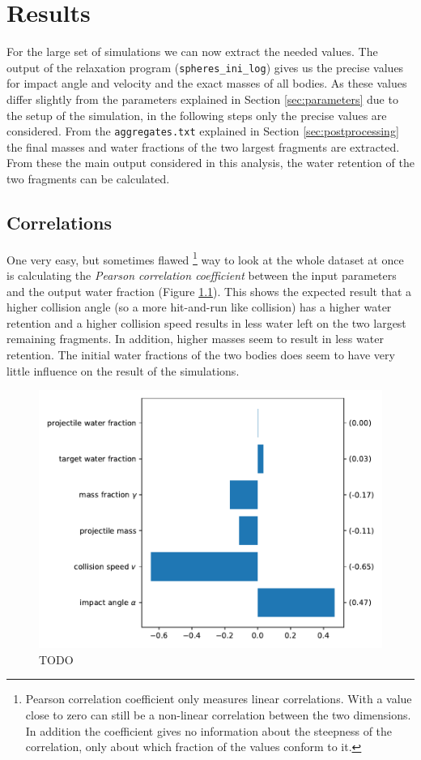\chapter{Results}

For the large set of simulations we can now extract the needed values. The output of the relaxation program (\texttt{spheres\_ini\_log}) gives us the precise values for impact angle and velocity and the exact masses of all bodies. As these values differ slightly from the parameters explained in Section \ref{sec:parameters} due to the setup of the simulation, in the following steps only the precise values are considered. From the \texttt{aggregates.txt} explained in Section \ref{sec:postprocessing} the final masses and water fractions of the two largest fragments are extracted. From these the main output considered in this analysis, the water retention of the two fragments can be calculated. 

\section{Correlations}
\label{sec:cov}
One very easy, but sometimes flawed%
\footnote{Pearson correlation coefficient only measures linear correlations. With a value close to zero can still be a non-linear correlation between the two dimensions. In addition the coefficient gives no information about the steepness of the correlation, only about which fraction of the values conform to it.} 
way to look at the whole dataset at once is calculating the \textit{Pearson correlation coefficient} between the input parameters and the output water fraction (Figure \ref{fig:cov}). This shows the expected result that a higher collision angle (so a more hit-and-run like collision) has a higher water retention and a higher collision speed results in less water left on the two largest remaining fragments. In addition, higher masses seem to result in less water retention. The initial water fractions of the two bodies does seem to have very little influence on the result of the simulations.

\begin{figure}
	\centering
	\includegraphics[width=0.8\linewidth]{images/cov.pdf}
	\caption{TODO}
	\label{fig:cov}
\end{figure}